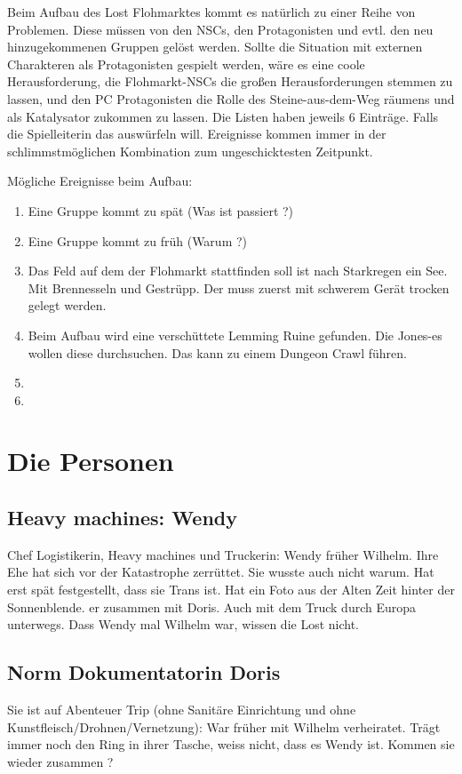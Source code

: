 \documentclass{book}
\begin{document}
Beim Aufbau des Lost Flohmarktes kommt es natürlich zu einer Reihe von Problemen. Diese müssen von den NSCs, den Protagonisten und evtl. den neu hinzugekommenen Gruppen gelöst werden. Sollte die Situation mit externen Charakteren als Protagonisten gespielt werden, wäre es eine coole Herausforderung, die Flohmarkt-NSCs die großen Herausforderungen stemmen zu lassen, und den PC Protagonisten die Rolle des Steine-aus-dem-Weg räumens und als Katalysator zukommen zu lassen. Die Listen haben jeweils 6 Einträge. Falls die Spielleiterin das auswürfeln will. Ereignisse kommen immer in der schlimmstmöglichen Kombination zum ungeschicktesten Zeitpunkt.

Mögliche Ereignisse beim Aufbau:

\begin{enumerate}
\item Eine Gruppe kommt zu spät (Was ist passiert ?)
\item Eine Gruppe kommt zu früh (Warum ?)
\item Das Feld auf dem der Flohmarkt stattfinden soll ist nach Starkregen ein See. Mit Brennesseln und Gestrüpp. Der muss zuerst mit schwerem Gerät trocken gelegt werden.
\item Beim Aufbau wird eine verschüttete Lemming Ruine gefunden. Die Jones-es wollen diese durchsuchen. Das kann zu einem Dungeon Crawl führen.
\item
\item
\end{enumerate}

\chapter{Die Personen}

\section{Heavy machines: Wendy}

Chef Logistikerin, Heavy machines und Truckerin: Wendy früher Wilhelm. Ihre Ehe hat sich vor der Katastrophe zerrüttet. Sie wusste auch nicht warum. Hat erst spät festgestellt, dass sie Trans ist. Hat ein Foto aus der Alten Zeit hinter der Sonnenblende. er zusammen mit Doris. Auch mit dem Truck durch Europa unterwegs. Dass Wendy mal Wilhelm war, wissen die Lost nicht.

\section{Norm Dokumentatorin Doris}
Sie ist auf Abenteuer Trip (ohne Sanitäre Einrichtung und ohne Kunstfleisch/Drohnen/Vernetzung): War früher mit Wilhelm verheiratet. Trägt immer noch den Ring in ihrer Tasche, weiss nicht, dass es Wendy ist. Kommen sie wieder zusammen ?
\end{document}
